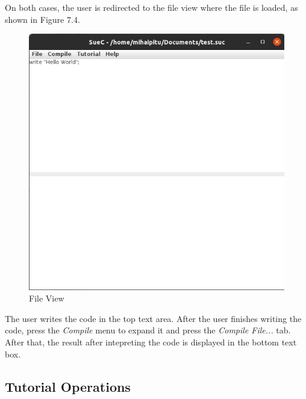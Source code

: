 \documentclass[12pt,a4paper,twoside]{report}
\begin{document}
On both cases, the user is redirected to the file view where the file is loaded, as shown in Figure 7.4.

\begin{figure}[H]
    \centering
    \includegraphics[width=0.5\linewidth]{img/userGuide/FileView.png}
    \caption{File View}
    \label{fig:conf}
\end{figure}

The user writes the code in the top text area. After the user finishes writing the code, press the \textit{Compile} menu to expand it and press the \textit{Compile File...} tab. After that, the result after intepreting the code is displayed in the bottom text box.

\subsection{Tutorial Operations}
\end{document}
